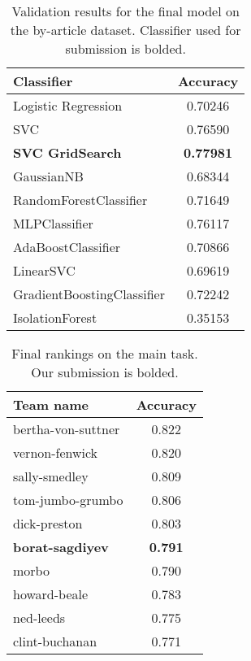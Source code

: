 \begin{table}
	\centering
	\small
	\begin{tabular}{lc}
		\toprule
		Classifier & Accuracy \\ 
		\midrule
		Logistic Regression & 0.70246 \\ 
		SVC & 0.76590\\
		\textbf{SVC GridSearch} & \textbf{0.77981}\\
		GaussianNB & 0.68344 \\ 
		RandomForestClassifier & 0.71649\\ 
		MLPClassifier & 0.76117 \\ 
		AdaBoostClassifier & 0.70866\\
		LinearSVC & 0.69619 \\ 
		GradientBoostingClassifier &  0.72242 \\ 
		IsolationForest & 0.35153 \\ 
		\bottomrule
	\end{tabular}
	\caption{Validation results for the final model on the by-article dataset. Classifier used for submission is bolded.}
	\label{table:final}
\end{table}

\begin{table}
	\centering
	\small
	\begin{tabular}{lc}
		\toprule
		Team name & Accuracy \\ 
		\midrule
		bertha-von-suttner & 0.822 \\ 
		vernon-fenwick & 0.820\\
		sally-smedley & 0.809\\
		tom-jumbo-grumbo & 0.806 \\ 
		dick-preston & 0.803\\ 
		\textbf{borat-sagdiyev} & \textbf{0.791} \\ 
		morbo & 0.790\\
		howard-beale & 0.783 \\ 
		ned-leeds &  0.775 \\ 
		clint-buchanan & 0.771 \\ 
		\bottomrule
	\end{tabular}
	\caption{Final rankings on the main task. Our submission is bolded.}
	\label{table:testset}
\end{table}
